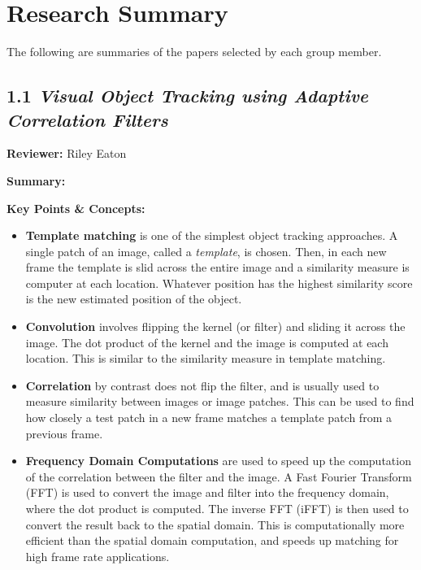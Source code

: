 \documentclass{article}
\begin{document}
\section*{Research Summary}

The following are summaries of the papers selected by each group member.

\subsection*{1.1 \textit{Visual Object Tracking using Adaptive Correlation Filters}}

\hspace*{\parindent}\textbf{Reviewer:} Riley Eaton

\vspace{0.3cm}

\textbf{Summary:} 

\vspace{0.3cm}

\textbf{Key Points \& Concepts:}
\begin{itemize}
  \item \textbf{Template matching} is one of the simplest object tracking approaches. A single patch of an image, called a \emph{template}, is chosen. Then, in each new frame the template is slid across the entire image and a similarity measure is computer at each location. Whatever position has the highest similarity score is the new estimated position of the object. 
  \item \textbf{Convolution} involves flipping the kernel (or filter) and sliding it across the image. The dot product of the kernel and the image is computed at each location. This is similar to the similarity measure in template matching.
  \item \textbf{Correlation} by contrast does not flip the filter, and is usually used to measure similarity between images or image patches. This can be used to find how closely a test patch in a new frame matches a template patch from a previous frame.
  \item \textbf{Frequency Domain Computations} are used to speed up the computation of the correlation between the filter and the image. A Fast Fourier Transform (FFT) is used to convert the image and filter into the frequency domain, where the dot product is computed. The inverse FFT (iFFT) is then used to convert the result back to the spatial domain. This is computationally more efficient than the spatial domain computation, and speeds up matching for high frame rate applications.
\end{itemize}
\end{document}
